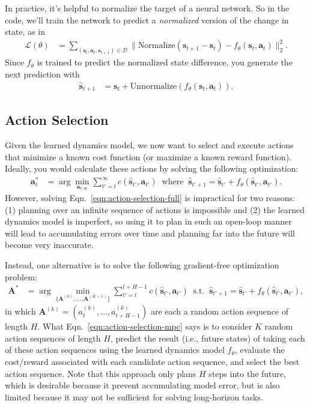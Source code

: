 \documentclass{article} %
\newcommand{\bs}{\mathbf{s}}
\newcommand{\ba}{\mathbf{a}}
\newcommand{\bA}{\mathbf{A}}
\begin{document}
In practice, it's helpful to normalize the target of a neural network.
So in the code, we'll train the network to predict a \emph{normalized} version of the change in state, as in
\begin{align}
\mathcal{L}(\theta) &= \sum_{(\bs_t, \ba_t, \bs_{t+1}) \in \mathcal{D}} \| \text{Normalize}(\bs_{t+1} - \bs_t) - f_\theta(\bs_t, \ba_t) \|_2^2.
\end{align}
Since $f_\theta$ is trained to predict the normalized state difference, you generate the next prediction with
\begin{align}
\hat{\bs}_{t+1} &= \bs_t + \text{Unnormalize}(f_\theta(\bs_t, \ba_t)).
\end{align}

\subsection{Action Selection}

Given the learned dynamics model, we now want to select and execute actions that minimize a known cost function (or maximize a known reward function). Ideally, you would calculate these actions by solving the following optimization:
\begin{align}
\ba_t^* &= \arg\min_{\ba_{t:\infty}} \sum_{t'=t}^\infty c(\hat{\bs}_{t'}, \ba_{t'}) \;\;\text{where}\;\; \hat{\bs}_{t'+1} = \hat{\bs}_{t'} + f_\theta(\hat{\bs}_{t'}, \ba_{t'}). \label{eqn:action-selection-full}
\end{align}
However, solving Eqn.~\ref{eqn:action-selection-full} is impractical for two reasons: (1) planning over an infinite sequence of actions is impossible and (2) the learned dynamics model is imperfect, so using it to plan in such an open-loop manner will lead to accumulating errors over time and planning far into the future will become very inaccurate.

Instead, one alternative is to solve the following gradient-free optimization problem:
\begin{align}
\bA^* &= \arg\min_{\{\bA^{(0)}, ..., \bA^{(K-1)}\}} \sum_{t'=t}^{t+H-1} c(\hat{\bs}_{t'}, \ba_{t'}) \;\;\text{s.t.}\;\; \hat{\bs}_{t'+1} = \hat{\bs}_{t'} + f_\theta(\hat{\bs}_{t'}, \ba_{t'}), \label{eqn:action-selection-mpc}
\end{align}
in which $\bA^{(k)} = (a_t^{(k)}, \dots, a_{t+H-1}^{(k)})$ are each a random action sequence of length $H$. What Eqn.~\ref{eqn:action-selection-mpc} says is to consider $K$ random action sequences of length $H$, predict the result (i.e., future states) of taking each of these action sequences using the learned dynamics model $f_\theta$, evaluate the cost/reward associated with each candidate action sequence, and select the best action sequence. Note that this approach only plans $H$ steps into the future, which is desirable because it prevent accumulating model error, but is also limited because it may not be sufficient for solving long-horizon tasks.
\end{document}
